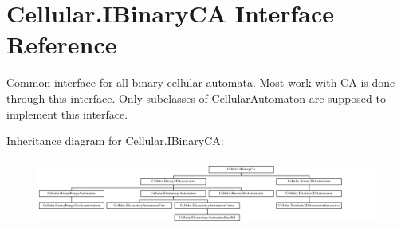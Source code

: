 \hypertarget{interface_cellular_1_1_i_binary_c_a}{}\section{Cellular.\+I\+Binary\+C\+A Interface Reference}
\label{interface_cellular_1_1_i_binary_c_a}


Common interface for all binary cellular automata. Most work with C\+A is done through this interface. Only subclasses of {\ttfamily \hyperlink{class_cellular_1_1_cellular_automaton}{Cellular\+Automaton}} are supposed to implement this interface.  


Inheritance diagram for Cellular.\+I\+Binary\+C\+A\+:\begin{figure}[H]
\begin{center}
\leavevmode
\includegraphics[height=2.231076cm]{interface_cellular_1_1_i_binary_c_a}
\end{center}
\end{figure}
